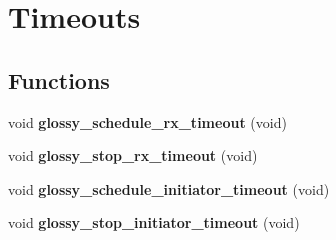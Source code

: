 \hypertarget{group__glossy__timeouts}{
\section{Timeouts}
\label{group__glossy__timeouts}
}
\subsection*{Functions}
\begin{DoxyCompactItemize}
\item 
\hypertarget{group__glossy__timeouts_gaf65d041af0217771bc6177a829c0e490}{
void {\bfseries glossy\_\-schedule\_\-rx\_\-timeout} (void)}
\label{group__glossy__timeouts_gaf65d041af0217771bc6177a829c0e490}

\item 
\hypertarget{group__glossy__timeouts_ga8bfbcadfe82f03bd255d4769d60b1257}{
void {\bfseries glossy\_\-stop\_\-rx\_\-timeout} (void)}
\label{group__glossy__timeouts_ga8bfbcadfe82f03bd255d4769d60b1257}

\item 
\hypertarget{group__glossy__timeouts_ga644979b6e29ab398f19bde3502e31fa2}{
void {\bfseries glossy\_\-schedule\_\-initiator\_\-timeout} (void)}
\label{group__glossy__timeouts_ga644979b6e29ab398f19bde3502e31fa2}

\item 
\hypertarget{group__glossy__timeouts_gab9b5f738a3d4732bdf8c2fb271200f91}{
void {\bfseries glossy\_\-stop\_\-initiator\_\-timeout} (void)}
\label{group__glossy__timeouts_gab9b5f738a3d4732bdf8c2fb271200f91}

\end{DoxyCompactItemize}
